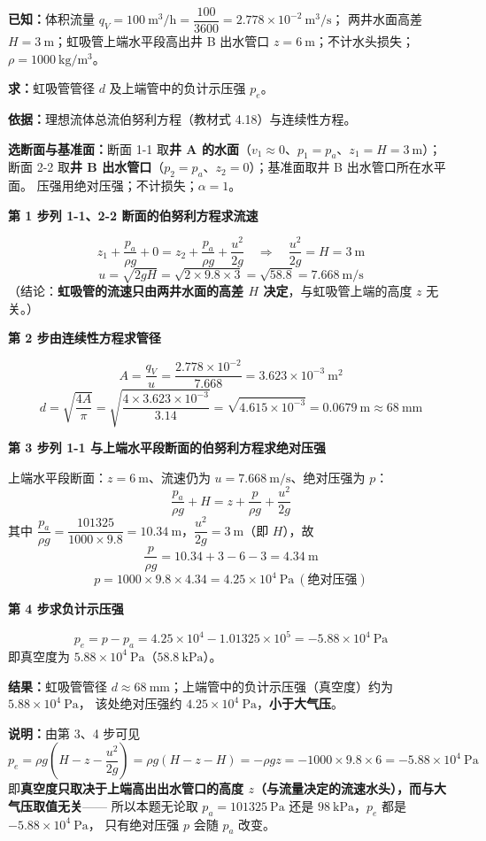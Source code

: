 \begin{jie}
\textbf{已知：}体积流量 $q_V=100\ \mathrm{m^3/h}=\dfrac{100}{3600}=2.778\times10^{-2}\ \mathrm{m^3/s}$；
两井水面高差 $H=3\ \mathrm{m}$；虹吸管上端水平段高出井 B 出水管口 $z=6\ \mathrm{m}$；不计水头损失；$\rho=1000\ \mathrm{kg/m^3}$。

\textbf{求：}虹吸管管径 $d$ 及上端管中的负计示压强 $p_e$。

\textbf{依据：}理想流体总流伯努利方程（教材式 4.18）与连续性方程。

\textbf{选断面与基准面：}断面 1-1 取\textbf{井 A 的水面}（$v_1\approx0$、$p_1=p_a$、$z_1=H=3\ \mathrm{m}$）；
断面 2-2 取\textbf{井 B 出水管口}（$p_2=p_a$、$z_2=0$）；基准面取井 B 出水管口所在水平面。
压强用绝对压强；不计损失；$\alpha=1$。

\textbf{第 1 步\quad 列 1-1、2-2 断面的伯努利方程求流速}

\[ z_1+\frac{p_a}{\rho g}+0=z_2+\frac{p_a}{\rho g}+\frac{u^2}{2g}
   \quad\Longrightarrow\quad
   \frac{u^2}{2g}=H=3\ \mathrm{m} \]
\[ u=\sqrt{2gH}=\sqrt{2\times9.8\times3}=\sqrt{58.8}=7.668\ \mathrm{m/s} \]
（结论：\textbf{虹吸管的流速只由两井水面的高差 $H$ 决定}，与虹吸管上端的高度 $z$ 无关。）

\textbf{第 2 步\quad 由连续性方程求管径}

\[ A=\frac{q_V}{u}=\frac{2.778\times10^{-2}}{7.668}=3.623\times10^{-3}\ \mathrm{m^2} \]
\[ d=\sqrt{\frac{4A}{\pi}}=\sqrt{\frac{4\times3.623\times10^{-3}}{3.14}}=\sqrt{4.615\times10^{-3}}=0.0679\ \mathrm{m}\approx68\ \mathrm{mm} \]

\textbf{第 3 步\quad 列 1-1 与上端水平段断面的伯努利方程求绝对压强}

上端水平段断面：$z=6\ \mathrm{m}$、流速仍为 $u=7.668\ \mathrm{m/s}$、绝对压强为 $p$：
\[ \frac{p_a}{\rho g}+H=z+\frac{p}{\rho g}+\frac{u^2}{2g} \]
其中 $\dfrac{p_a}{\rho g}=\dfrac{101325}{1000\times9.8}=10.34\ \mathrm{m}$，$\dfrac{u^2}{2g}=3\ \mathrm{m}$（即 $H$），故
\[ \frac{p}{\rho g}=10.34+3-6-3=4.34\ \mathrm{m} \]
\[ p=1000\times9.8\times4.34=4.25\times10^4\ \mathrm{Pa}\ (\text{绝对压强}) \]

\textbf{第 4 步\quad 求负计示压强}

\[ p_e=p-p_a=4.25\times10^4-1.01325\times10^5=-5.88\times10^4\ \mathrm{Pa} \]
即真空度为 $5.88\times10^4\ \mathrm{Pa}$（$58.8\ \mathrm{kPa}$）。

\textbf{结果：}虹吸管管径 $d\approx68\ \mathrm{mm}$；上端管中的负计示压强（真空度）约为 $5.88\times10^4\ \mathrm{Pa}$，
该处绝对压强约 $4.25\times10^4\ \mathrm{Pa}$，\textbf{小于大气压}。

\textbf{说明：}由第 3、4 步可见
\[ p_e=\rho g\left(H-z-\frac{u^2}{2g}\right)=\rho g(H-z-H)=-\rho gz=-1000\times9.8\times6=-5.88\times10^4\ \mathrm{Pa} \]
即\textbf{真空度只取决于上端高出出水管口的高度 $z$（与流量决定的流速水头），而与大气压取值无关}——
所以本题无论取 $p_a=101325\ \mathrm{Pa}$ 还是 $98\ \mathrm{kPa}$，$p_e$ 都是 $-5.88\times10^4\ \mathrm{Pa}$，
只有绝对压强 $p$ 会随 $p_a$ 改变。
\end{jie}

